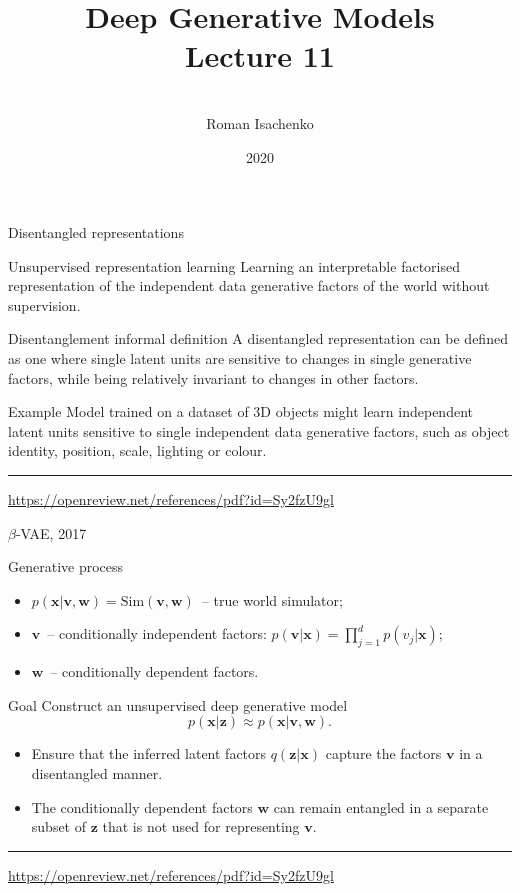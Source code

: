 \documentclass{beamer}
\title[\hbox to 56mm{Deep Generative Models  \hfill\insertframenumber\,/\,\inserttotalframenumber}]
{Deep Generative Models \\ Lecture 11}
\author[Roman Isachenko]{\\Roman Isachenko}
\institute[MIPT]{Moscow Institute of Physics and Technology \\
}
\date{2020}
\newcommand{\bv}{\mathbf{v}}
\newcommand{\bw}{\mathbf{w}}
\newcommand{\bx}{\mathbf{x}}
\newcommand{\bz}{\mathbf{z}}
\begin{document}
\begin{frame}
\titlepage
\end{frame}
\begin{frame}{Disentangled representations}
\begin{block}{Unsupervised representation learning}
    Learning an interpretable factorised representation of the independent data generative factors of the world without supervision. 
\end{block}
\begin{block}{Disentanglement informal definition}
A disentangled representation can be defined as one where single latent units are sensitive to changes in single generative factors, while being relatively invariant to changes in other factors. 
\end{block}
\begin{block}{Example}
Model trained on a dataset of 3D objects might learn independent latent units sensitive to single independent data generative factors, such as object identity, position, scale, lighting or colour. 
\end{block}
\vfill
\hrule\medskip
{\scriptsize \href{https://openreview.net/references/pdf?id=Sy2fzU9gl}{https://openreview.net/references/pdf?id=Sy2fzU9gl}}
\end{frame}
\begin{frame}{$\beta$-VAE, 2017}
\begin{block}{Generative process}
\begin{itemize}
    \item $p(\bx | \bv, \bw) = \text{Sim}(\bv, \bw)$~-- true world simulator;
    \item $\bv$~-- conditionally independent factors: $p(\bv | \bx) = \prod_{j=1}^d p(v_j | \bx)$;
    \item $\bw$~-- conditionally dependent factors. 
\end{itemize}
\end{block}
\begin{block}{Goal}
Construct an unsupervised deep generative model
\[
    p(\bx | \bz) \approx p(\bx | \bv, \bw).
\]
\vspace{-0.5cm}
\begin{itemize}
    \item Ensure that the inferred latent factors $q(\bz|\bx)$ capture the factors $\bv$ in a disentangled manner. 
    \item The conditionally dependent factors $\bw$ can remain entangled in a separate subset of $\bz$ that is not used for representing $\bv$. 
\end{itemize}
\end{block}
\vfill
\hrule\medskip
{\scriptsize \href{https://openreview.net/references/pdf?id=Sy2fzU9gl}{https://openreview.net/references/pdf?id=Sy2fzU9gl}}
\end{frame}
\end{document}
